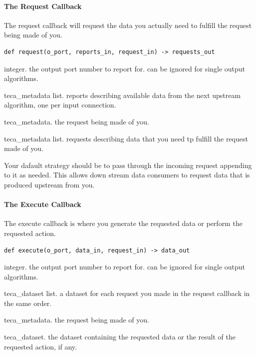 \documentclass[a4paper,10pt,DIV=12]{scrreprt}
\begin{document}
\paragraph{The Request Callback}
\noindent The request callback will request the data you actually need to fulfill the request being made of you.
\begin{verbatim}
def request(o_port, reports_in, request_in) -> requests_out
\end{verbatim}
\noindent\hspace{0.25in}\begin{minipage}{0.8\textwidth}
\begin{description}
 \setlength\itemsep{0mm}
 \item[o\_port] integer. the output port number to report for. can be ignored for single output algorithms.
 \item[reports\_in] teca\_metadata list. reports describing available data from the next upstream algorithm, one per input connection.
 \item[request\_in] teca\_metadata. the request being made of you.
 \item[report\_out] teca\_metadata list. requests describing data that you need tp fulfill the request made of you.
\end{description}
\vspace{2mm}
\end{minipage}

\noindent Your dafault strategy should be to pass through the incoming request appending to it as needed. This allows down stream data consumers to request data that is produced upstream from you.
\paragraph{The Execute Callback}
\noindent The execute callback is where you generate the requested data or perform the requested action.
\begin{verbatim}
def execute(o_port, data_in, request_in) -> data_out
\end{verbatim}
\noindent\hspace{0.25in}\begin{minipage}{0.8\textwidth}
\begin{description}
 \setlength\itemsep{0mm}
 \item[o\_port] integer. the output port number to report for. can be ignored for single output algorithms.
 \item[data\_in] teca\_dataset list. a dataset for each request you made in the request callback in the same order.
 \item[request\_in] teca\_metadata. the request being made of you.
 \item[data\_out] teca\_dataset. the dataset containing the requested data or the result of the requested action, if any.
\end{description}
\vspace{2mm}
\end{minipage}
\end{document}
